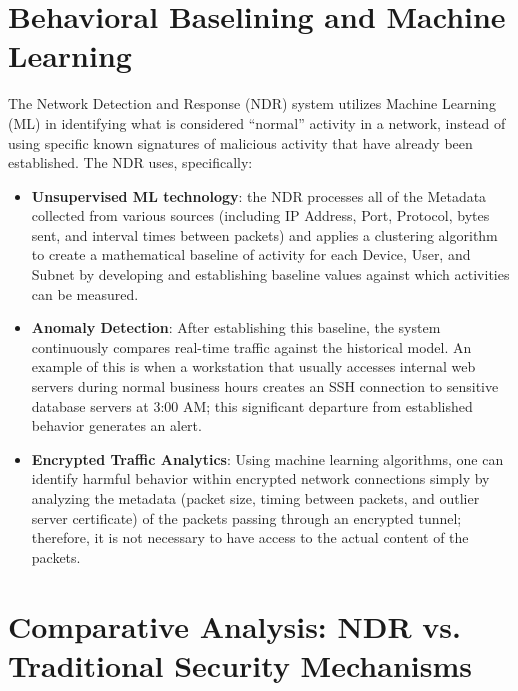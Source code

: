 \documentclass[12pt,a4paper]{report}
\begin{document}

\section{Behavioral Baselining and Machine Learning}
The Network Detection and Response (NDR) system utilizes Machine Learning (ML) in identifying what is considered ``normal'' activity in a network, instead of using specific known signatures of malicious activity that have already been established. The NDR uses, specifically:

\begin{itemize}
    \item \textbf{Unsupervised ML technology}: the NDR processes all of the Metadata collected from various sources (including IP Address, Port, Protocol, bytes sent, and interval times between packets) and applies a clustering algorithm to create a mathematical baseline of activity for each Device, User, and Subnet by developing and establishing baseline values against which activities can be measured.
    
    \item \textbf{Anomaly Detection}: After establishing this baseline, the system continuously compares real-time traffic against the historical model. An example of this is when a workstation that usually accesses internal web servers during normal business hours creates an SSH connection to sensitive database servers at 3:00 AM; this significant departure from established behavior generates an alert.

    \item \textbf{Encrypted Traffic Analytics}: Using machine learning algorithms, one can identify harmful behavior within encrypted network connections simply by analyzing the metadata (packet size, timing between packets, and outlier server certificate) of the packets passing through an encrypted tunnel; therefore, it is not necessary to have access to the actual content of the packets.
    
\end{itemize}




\section{Comparative Analysis: NDR vs. Traditional Security Mechanisms}
\end{document}
